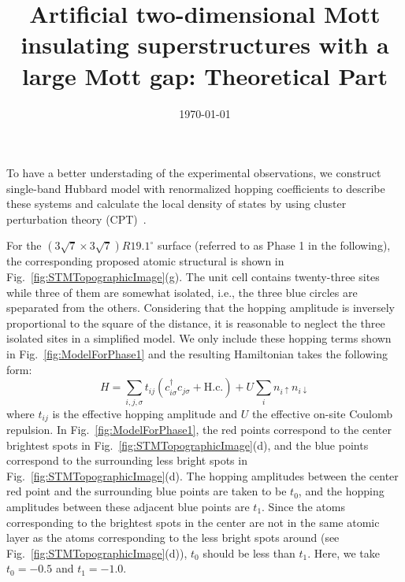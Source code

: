 \documentclass[aps,prb,amsfonts,amsmath,amssymb,showpacs,groupedaddress,superscriptaddress]{revtex4-1}
\begin{document}
\title{Artificial two-dimensional Mott insulating superstructures with a large Mott gap: Theoretical Part}

\date{\today}

\maketitle

To have a better understading of the experimental observations, we construct single-band Hubbard model with renormalized hopping coefficients to describe these systems and calculate the local density of states by using cluster perturbation theory (CPT)~\cite{PhysRevB.48.418,PhysRevLett.84.522}.

For the $(3\sqrt{7} \times 3\sqrt{7})R19.1^\circ$ surface (referred to as Phase 1 in the following), the corresponding proposed atomic structural is shown in Fig.~\ref{fig:STMTopographicImage}(g). The unit cell contains twenty-three sites while three of them are somewhat isolated, i.e., the three blue circles are speparated from the others. Considering that the hopping amplitude is inversely proportional to the square of the distance, it is reasonable to neglect the three isolated sites in a simplified model. We only include these hopping terms shown in Fig.~\ref{fig:ModelForPhase1} and the resulting Hamiltonian takes the following form:
\begin{equation}
    H = \sum_{i,j,\sigma} t_{ij}(c_{i\sigma}^{\dagger}c_{j\sigma} + \text{H.c.}) + U \sum_{i} n_{i\uparrow} n_{i\downarrow}
    \label{eq:ModelHamiltonian}
\end{equation}
where $t_{ij}$ is the effective hopping amplitude and $U$ the effective on-site Coulomb repulsion. In Fig.~\ref{fig:ModelForPhase1}, the red points correspond to the center brightest spots in Fig.~\ref{fig:STMTopographicImage}(d), and the blue points correspond to the surrounding less bright spots in Fig.~\ref{fig:STMTopographicImage}(d). The hopping amplitudes between the center red point and the surrounding blue points are taken to be $t_0$, and the hopping amplitudes between these adjacent blue points are $t_1$. Since the atoms corresponding to the brightest spots in the center are not in the same atomic layer as the atoms corresponding to the less bright spots around (see Fig.~\ref{fig:STMTopographicImage}(d)), $t_0$ should be less than $t_1$. Here, we take $t_0 = -0.5$ and $t_1 = -1.0$.
\end{document}
